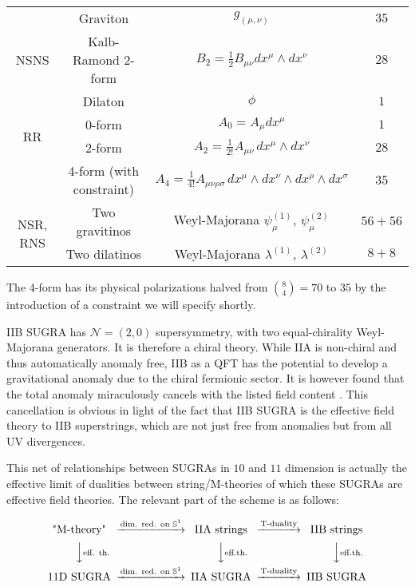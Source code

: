 \begin{center}
	\begin{tabular}{|c|c|c|c|}
		\hline
		\multirow{3}{*}{NSNS} 
	&	Graviton	& $g_{(\mu,\nu)}$ 							& $35$\\
	&	Kalb-Ramond 2-form & $B_2 = \frac{1}{2} B_{\mu\nu} dx^\mu \wedge dx^\nu$ & $28$ \\
	&	Dilaton & $\phi$ & $1$ \\
		\hline \hline
		\multirow{2}{*}{RR} 
	&	0-form		& $A_0 = A_{\mu} dx^\mu$ & $1$\\
	&	2-form		& $A_2 = \frac{1}{2!} A_{\mu\nu} \, dx^\mu \wedge dx^\nu$ & $28$\\
	&	4-form	(with constraint)	& $A_4 = \frac{1}{4!} A_{\mu\nu\rho\sigma} \, dx^\mu \wedge dx^\nu \wedge dx^\rho \wedge dx^\sigma$ & $35$\\
		\hline \hline 
		\multirow{2}{*}{NSR, RNS}
	&	Two gravitinos	& Weyl-Majorana $\psi_\mu^{(1)}$, $\psi_\mu^{(2)}$ 	& $56+56$\\
	&	Two dilatinos	& Weyl-Majorana $\lambda^{(1)}$, $\lambda^{(2)}$ 	& $8+8$\\
		\hline
	\end{tabular}
\end{center}

The 4-form has its physical polarizations halved from ${8 \choose 4} = 70$ to $35$ by the introduction of a constraint we will specify shortly.

IIB SUGRA has $\mathcal{N}=(2,0)$ supersymmetry, with two equal-chirality Weyl-Majorana generators. It is therefore a chiral theory. While IIA is non-chiral and thus automatically anomaly free, IIB as a QFT has the potential to develop a gravitational anomaly due to the chiral fermionic sector. It is however found that the total anomaly miraculously cancels with the listed field content . This cancellation is obvious in light of the fact that IIB SUGRA is the effective field theory to IIB superstrings, which are not just free from anomalies but from all UV divergences.


This net of relationships between SUGRAs in $10$ and $11$ dimension is actually the effective limit of dualities between string/M-theories of which these SUGRAs are effective field theories. The relevant part of the scheme is as follows:

\[\begin{CD}
\text{"M-theory"}     @> \text{dim. red. on }\mathbb{S}^1>>  \text{IIA strings} @> \text{T-duality} >> \text{IIB strings} \\
@VV\text{eff. th.}V        @VV\text{eff.th.}V  @VV \text{eff.th.} V\\
\text{11D SUGRA}     @> \text{dim. red. on }\mathbb{S}^1>> \text{IIA SUGRA} @> \text{T-duality}>>  \text{IIB SUGRA}
\end{CD}\]
\\

